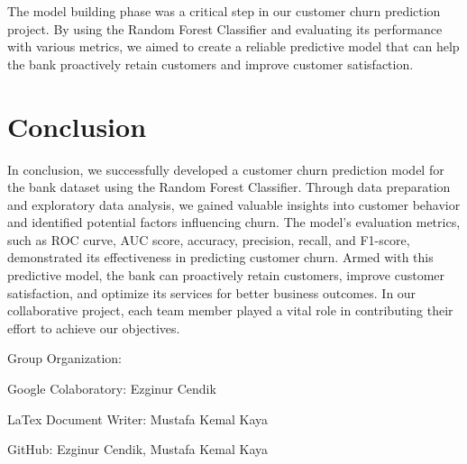 \documentclass[11pt,a4paper]{article}
\begin{document}
The model building phase was a critical step in our customer churn prediction project. By using the Random Forest Classifier and evaluating its performance with various metrics, we aimed to create a reliable predictive model that can help the bank proactively retain customers and improve customer satisfaction.


\section{Conclusion}

In conclusion, we successfully developed a customer churn prediction model for the bank dataset using the Random Forest Classifier. Through data preparation and exploratory data analysis, we gained valuable insights into customer behavior and identified potential factors influencing churn. The model's evaluation metrics, such as ROC curve, AUC score, accuracy, precision, recall, and F1-score, demonstrated its effectiveness in predicting customer churn. Armed with this predictive model, the bank can proactively retain customers, improve customer satisfaction, and optimize its services for better business outcomes.
In our collaborative project, each team member played a vital role in contributing their effort to achieve our objectives. 

Group Organization:

Google Colaboratory: Ezginur Cendik

LaTex Document Writer: Mustafa Kemal Kaya

GitHub: Ezginur Cendik, Mustafa Kemal Kaya




\end{document}
